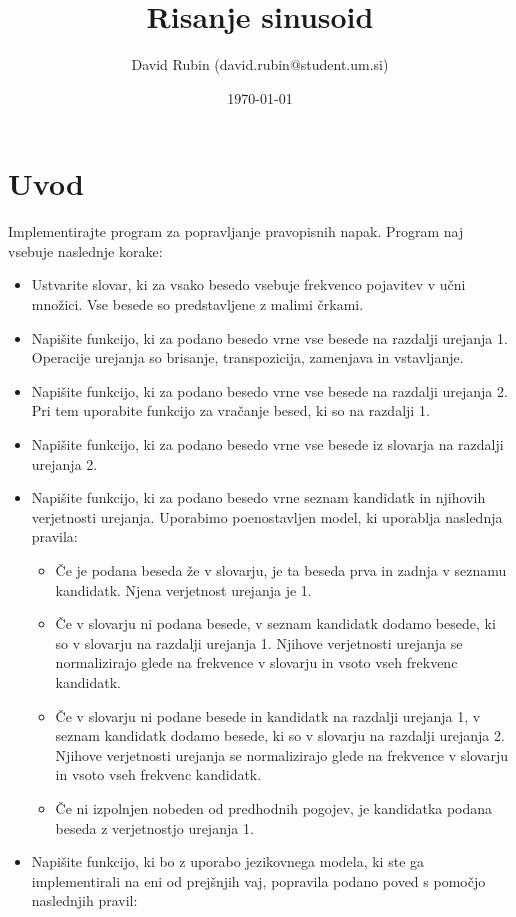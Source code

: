 \documentclass[a4paper,11pt]{article}
\title{Risanje sinusoid}
\author{David Rubin (david.rubin@student.um.si)}
\date{\today}
\begin{document}
\maketitle

\section{Uvod}

Implementirajte program za popravljanje pravopisnih napak. Program naj vsebuje naslednje korake:
\begin{itemize}
    \item Ustvarite slovar, ki za vsako besedo vsebuje frekvenco pojavitev v učni množici. Vse besede so predstavljene z malimi črkami.
    \item Napišite funkcijo, ki za podano besedo vrne vse besede na razdalji urejanja 1. Operacije urejanja so brisanje, transpozicija, zamenjava in vstavljanje.
    \item Napišite funkcijo, ki za podano besedo vrne vse besede na razdalji urejanja 2. Pri tem uporabite funkcijo za vračanje besed, ki so na razdalji 1.
    \item Napišite funkcijo, ki za podano besedo vrne vse besede iz slovarja na razdalji urejanja 2.
    \item Napišite funkcijo, ki za podano besedo vrne seznam kandidatk in njihovih verjetnosti urejanja. Uporabimo poenostavljen model, ki uporablja naslednja pravila:
        \begin{itemize}
        \item Če je podana beseda že v slovarju, je ta beseda prva in zadnja v seznamu kandidatk. Njena verjetnost urejanja je 1.
        \item Če v slovarju ni podana besede, v seznam kandidatk dodamo besede, ki so v slovarju na razdalji urejanja 1. Njihove verjetnosti urejanja se normalizirajo glede na frekvence v slovarju in vsoto vseh frekvenc kandidatk.
        \item Če v slovarju ni podane besede in kandidatk na razdalji urejanja 1, v  seznam kandidatk dodamo besede, ki so v slovarju na razdalji urejanja 2. Njihove verjetnosti urejanja se normalizirajo glede na frekvence v slovarju in vsoto vseh frekvenc kandidatk.
        \item Če ni izpolnjen nobeden od predhodnih pogojev, je kandidatka podana beseda z verjetnostjo urejanja 1.
		\end{itemize}    
    \item Napišite funkcijo, ki bo z uporabo jezikovnega modela, ki ste ga implementirali na eni od prejšnjih vaj, popravila podano poved s pomočjo naslednjih pravil:

\end{itemize}
\end{document}
